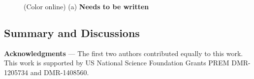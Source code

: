 \documentclass[prl,aps,epsf,showpacs,twocolumn,letterpaper]{revtex4}
\begin{document}
\begin{figure}[h]
	\caption{
		(Color online) (a) \bf Needs to be written}
	\label{fig5}
\end{figure} 

\subsection{Summary and Discussions}
                                 

{\bf Acknowledgments} --- The first two authors contributed equally to this
work.  This work is supported by US National Science Foundation  Grants PREM
DMR-1205734 and DMR-1408560.




\end{document}
